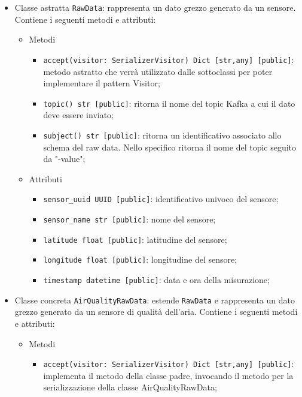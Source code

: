 \begin{itemize}
	\item Classe astratta \texttt{RawData}: rappresenta un dato grezzo generato da un sensore. Contiene i seguenti metodi e attributi:
	      \begin{itemize}
		      \item Metodi
		            \begin{itemize}
			            \item \texttt{accept(visitor: SerializerVisitor) Dict [str,any] [public]}: metodo astratto che verrà utilizzato dalle sottoclassi per poter implementare il pattern Visitor;
			            \item \texttt{topic() str [public]}: ritorna il nome del topic Kafka a cui il dato deve essere inviato;
			            \item \texttt{subject() str [public]}: ritorna un identificativo associato allo schema del raw data. Nello specifico ritorna il nome del topic seguito da "-value";
		            \end{itemize}
		      \item Attributi
		            \begin{itemize}
			            \item \texttt{sensor\_uuid UUID [public]}: identificativo univoco del sensore;
			            \item \texttt{sensor\_name str [public]}: nome del sensore;
			            \item \texttt{latitude float [public]}: latitudine del sensore;
			            \item \texttt{longitude float [public]}: longitudine del sensore;
			            \item \texttt{timestamp datetime [public]}: data e ora della misurazione;
		            \end{itemize}
	      \end{itemize}
	\item Classe concreta \texttt{AirQualityRawData}: estende \texttt{RawData} e rappresenta un dato grezzo generato da un sensore di qualità dell'aria. Contiene i seguenti metodi e attributi:
	      \begin{itemize}
		      \item Metodi
		            \begin{itemize}
			            \item \texttt{accept(visitor: SerializerVisitor) Dict [str,any] [public]}: implementa il metodo della classe padre, invocando il metodo per la serializzazione della classe AirQualityRawData;

\end{itemize}
\end{itemize}
\end{itemize}
